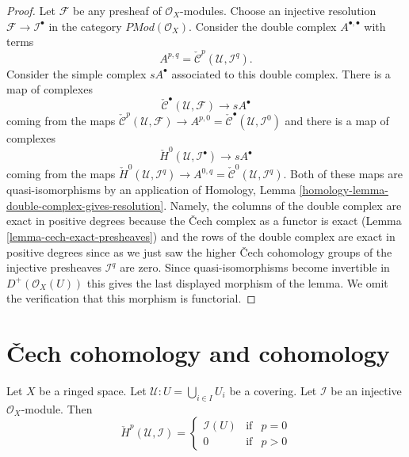 \begin{proof}
\medskip\noindent
Let $\mathcal{F}$ be any presheaf of $\mathcal{O}_X$-modules.
Choose an injective resolution $\mathcal{F} \to \mathcal{I}^\bullet$
in the category $\textit{PMod}(\mathcal{O}_X)$.
Consider the double complex $A^{\bullet, \bullet}$ with terms
$$
A^{p, q} =
\check{\mathcal{C}}^p(\mathcal{U}, \mathcal{I}^q).
$$
Consider the simple complex $sA^\bullet$ associated to this double
complex. There is a map of complexes
$$
\check{\mathcal{C}}^\bullet(\mathcal{U}, \mathcal{F})
\longrightarrow
sA^\bullet
$$
coming from the maps
$\check{\mathcal{C}}^p(\mathcal{U}, \mathcal{F})
\to A^{p, 0} = \check{\mathcal{C}}^\bullet(\mathcal{U}, \mathcal{I}^0)$
and there is a map of complexes
$$
\check{H}^0(\mathcal{U}, \mathcal{I}^\bullet)
\longrightarrow
sA^\bullet
$$
coming from the maps
$\check{H}^0(\mathcal{U}, \mathcal{I}^q) \to
A^{0, q} = \check{\mathcal{C}}^0(\mathcal{U}, \mathcal{I}^q)$.
Both of these maps are quasi-isomorphisms by an application of
Homology, Lemma \ref{homology-lemma-double-complex-gives-resolution}.
Namely, the columns of the double complex are exact in positive degrees
because the {\v C}ech complex as a functor is exact
(Lemma \ref{lemma-cech-exact-presheaves})
and the rows of the double complex are exact in positive degrees
since as we just saw the higher {\v C}ech cohomology groups of the injective
presheaves $\mathcal{I}^q$ are zero.
Since quasi-isomorphisms become invertible
in $D^{+}(\mathcal{O}_X(U))$ this gives the last displayed morphism
of the lemma. We omit the verification that this morphism is
functorial.
\end{proof}





\section{{\v C}ech cohomology and cohomology}
\label{section-cech-cohomology-cohomology}

\begin{lemma}
\label{lemma-injective-trivial-cech}
Let $X$ be a ringed space.
Let $\mathcal{U} : U = \bigcup_{i \in I} U_i$ be a covering.
Let $\mathcal{I}$ be an injective $\mathcal{O}_X$-module.
Then
$$
\check{H}^p(\mathcal{U}, \mathcal{I}) =
\left\{
\begin{matrix}
\mathcal{I}(U) & \text{if} & p = 0 \\
0 & \text{if} & p > 0
\end{matrix}
\right.
$$
\end{lemma}

